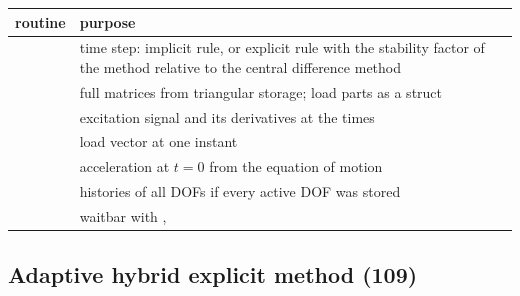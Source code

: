 \begin{xltabular}{\linewidth}{@{}P{6.4cm}L@{}}
  \toprule
  routine & purpose \\
  \midrule
   & time step: implicit
    rule, or explicit rule with the stability factor of the method relative to
    the central difference method \\
   & full matrices
    from triangular storage; load parts as a struct \\
   & excitation
    signal and its derivatives at the times  \\
   & load vector at one instant \\
   &
    acceleration at $t = 0$ from the equation of motion \\
   & histories
    of all DOFs if every active DOF was stored \\
   & waitbar with
    ,  \\
  \bottomrule
\end{xltabular}

\subsection{Adaptive hybrid explicit method (109)}
\label{sec:ahem}

